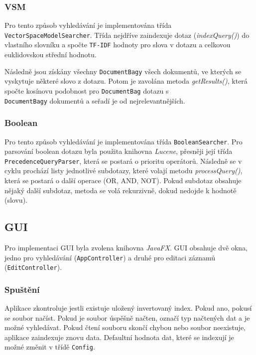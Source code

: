 \documentclass[12pt, a4paper]{article}
\begin{document}
\subsubsection{VSM}
\noindent Pro tento způsob vyhledávání je implementována třída \texttt{VectorSpaceModel\-Searcher}. Třída nejdříve zaindexuje dotaz (\textit{indexQuery()}) do vlastního slovníku a spočte \texttt{TF-IDF} hodnoty pro slova v dotazu a celkovou euklidovskou střední hodnotu.

Následně jsou získány všechny \texttt{DocumentBagy} všech dokumentů, ve kterých se vyskytuje některé slovo z dotazu. Potom je zavolána metoda \textit{getResults()}, která spočte kosínovu podobnost pro \texttt{DocumentBag} dotazu s \\\texttt{DocumentBagy} dokumentů a seřadí je od nejrelevantnějších.

\subsubsection{Boolean}
\noindent Pro tento způsob vyhledávání je implementována třída \texttt{BooleanSearcher}. Pro parsování boolean dotazu byla použita knihovna \textit{Lucene}, přesněji její třída \texttt{PrecedenceQueryParser}, která se postará o prioritu operátorů. Následně se v cyklu prochází listy jednotlivé subdotazy, které volají metodu \textit{processQuery()}, která se postará o další operace (OR, AND, NOT). Pokud subdotaz obsahuje nějaký další subdotaz, metoda se volá rekurzivně, dokud nedojde k hodnotě (slovu).

\subsection{GUI}
\noindent Pro implementaci GUI byla zvolena knihovna \textit{JavaFX}. GUI obsahuje dvě okna, jedno pro vyhledávání (\texttt{AppController}) a druhé pro editaci záznamů (\texttt{EditController}).

\subsubsection{Spuštění}\label{gui-index}
\noindent Aplikace zkontroluje jestli existuje uložený invertovaný index. Pokud ano, pokusí se soubor načíst. Pokud je soubor úspěšně načten, označí typ načtených dat a je možné vyhledávat. Pokud čtení souboru skončí chybou nebo soubor neexistuje, aplikace zaindexuje znovu data. Defaultní hodnota dat, které se indexují je možné změnit v třídě \texttt{Config}.
\end{document}
